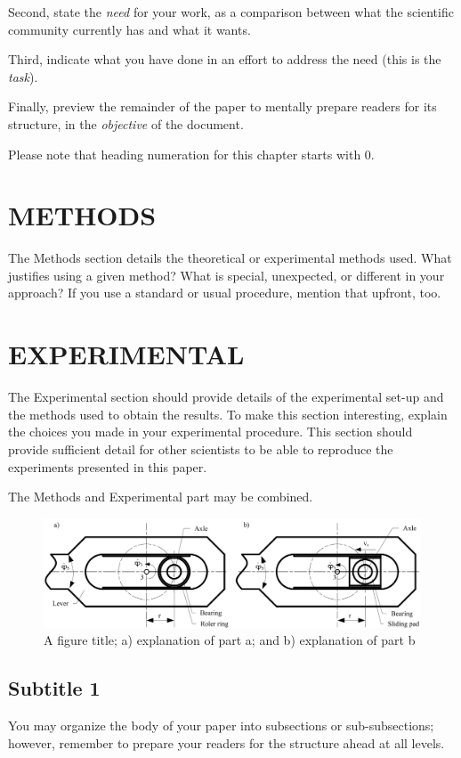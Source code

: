 \documentclass[10pt]{JoME}
\begin{document}
Second, state the \emph{need} for your work, as a comparison between what the scientific community currently has and what it wants.

Third, indicate what you have done in an effort to address the need (this is the \emph{task}).

Finally, preview the remainder of the paper to mentally prepare readers for its structure, in the \emph{objective} of the document.

Please note that heading numeration for this chapter starts with 0.

\section{METHODS}

The Methods section details the theoretical or experimental methods used. What justifies using a given method? What is special, unexpected, or different in your approach? If you use a standard or usual procedure, mention that upfront, too.


\section{EXPERIMENTAL}

The Experimental section should provide details of the experimental set-up and the methods used to obtain the results. To make this section interesting, explain the choices you made in your experimental procedure. This section should provide sufficient detail for other scientists to be able to reproduce the experiments presented in this paper.

The Methods and Experimental part may be combined. 

\begin{figure}
\includegraphics[width=161mm]{fig1.png}
\caption{A figure title; a) explanation of part a; and b) explanation of part b\label{figA}}
\end{figure}

\subsection{Subtitle 1}
You may organize the body of your paper into subsections or sub-subsections; however, remember to prepare your readers for the structure ahead at all levels.
\end{document}
